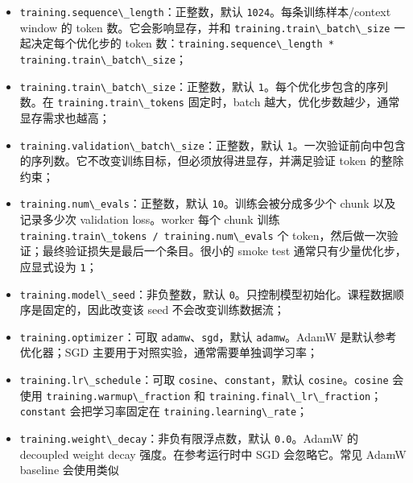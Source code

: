\documentclass[
]{ctexart}
\newcommand{\passthrough}[1]{#1}
\providecommand{\tightlist}{%
  \setlength{\itemsep}{0pt}\setlength{\parskip}{0pt}}
\begin{document}
\begin{itemize}
\tightlist
\item
  \passthrough{\lstinline!training.sequence\_length!}：正整数，默认
  \passthrough{\lstinline!1024!}。每条训练样本/context window 的 token
  数。它会影响显存，并和
  \passthrough{\lstinline!training.train\_batch\_size!}
  一起决定每个优化步的 token
  数：\passthrough{\lstinline!training.sequence\_length * training.train\_batch\_size!}；
\item
  \passthrough{\lstinline!training.train\_batch\_size!}：正整数，默认
  \passthrough{\lstinline!1!}。每个优化步包含的序列数。在
  \passthrough{\lstinline!training.train\_tokens!} 固定时，batch
  越大，优化步数越少，通常显存需求也越高；
\item
  \passthrough{\lstinline!training.validation\_batch\_size!}：正整数，默认
  \passthrough{\lstinline!1!}。一次验证前向中包含的序列数。它不改变训练目标，但必须放得进显存，并满足验证
  token 的整除约束；
\item
  \passthrough{\lstinline!training.num\_evals!}：正整数，默认
  \passthrough{\lstinline!10!}。训练会被分成多少个 chunk 以及记录多少次
  validation loss。worker 每个 chunk 训练
  \passthrough{\lstinline!training.train\_tokens / training.num\_evals!}
  个 token，然后做一次验证；最终验证损失是最后一个条目。很小的 smoke
  test 通常只有少量优化步，应显式设为 \passthrough{\lstinline!1!}；
\item
  \passthrough{\lstinline!training.model\_seed!}：非负整数，默认
  \passthrough{\lstinline!0!}。只控制模型初始化。课程数据顺序是固定的，因此改变该
  seed 不会改变训练数据流；
\item
  \passthrough{\lstinline!training.optimizer!}：可取
  \passthrough{\lstinline!adamw!}、\passthrough{\lstinline!sgd!}，默认
  \passthrough{\lstinline!adamw!}。AdamW 是默认参考优化器；SGD
  主要用于对照实验，通常需要单独调学习率；
\item
  \passthrough{\lstinline!training.lr\_schedule!}：可取
  \passthrough{\lstinline!cosine!}、\passthrough{\lstinline!constant!}，默认
  \passthrough{\lstinline!cosine!}。\passthrough{\lstinline!cosine!}
  会使用 \passthrough{\lstinline!training.warmup\_fraction!} 和
  \passthrough{\lstinline!training.final\_lr\_fraction!}；\passthrough{\lstinline!constant!}
  会把学习率固定在 \passthrough{\lstinline!training.learning\_rate!}；
\item
  \passthrough{\lstinline!training.weight\_decay!}：非负有限浮点数，默认
  \passthrough{\lstinline!0.0!}。AdamW 的 decoupled weight decay
  强度。在参考运行时中 SGD 会忽略它。常见 AdamW baseline 会使用类似

\end{itemize}
\end{document}
